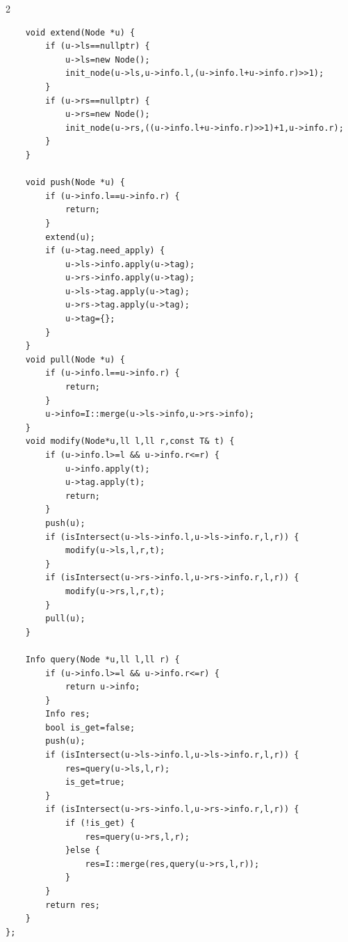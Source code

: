 \begin{multicols*}{2}
\begin{verbatim}
    void extend(Node *u) {
        if (u->ls==nullptr) {
            u->ls=new Node();
            init_node(u->ls,u->info.l,(u->info.l+u->info.r)>>1);
        }
        if (u->rs==nullptr) {
            u->rs=new Node();
            init_node(u->rs,((u->info.l+u->info.r)>>1)+1,u->info.r);
        }
    }

    void push(Node *u) {
        if (u->info.l==u->info.r) {
            return;
        }
        extend(u);
        if (u->tag.need_apply) {
            u->ls->info.apply(u->tag);
            u->rs->info.apply(u->tag);
            u->ls->tag.apply(u->tag);
            u->rs->tag.apply(u->tag);
            u->tag={};
        }
    }
    void pull(Node *u) {
        if (u->info.l==u->info.r) {
            return;
        }
        u->info=I::merge(u->ls->info,u->rs->info);
    }
    void modify(Node*u,ll l,ll r,const T& t) {
        if (u->info.l>=l && u->info.r<=r) {
            u->info.apply(t);
            u->tag.apply(t);
            return;
        }
        push(u);
        if (isIntersect(u->ls->info.l,u->ls->info.r,l,r)) {
            modify(u->ls,l,r,t);
        }
        if (isIntersect(u->rs->info.l,u->rs->info.r,l,r)) {
            modify(u->rs,l,r,t);
        }
        pull(u);
    }

    Info query(Node *u,ll l,ll r) {
        if (u->info.l>=l && u->info.r<=r) {
            return u->info;
        }
        Info res;
        bool is_get=false;
        push(u);
        if (isIntersect(u->ls->info.l,u->ls->info.r,l,r)) {
            res=query(u->ls,l,r);
            is_get=true;
        }
        if (isIntersect(u->rs->info.l,u->rs->info.r,l,r)) {
            if (!is_get) {
                res=query(u->rs,l,r);
            }else {
                res=I::merge(res,query(u->rs,l,r));
            }
        }
        return res;
    }
};

		\end{verbatim}


\end{multicols*}
